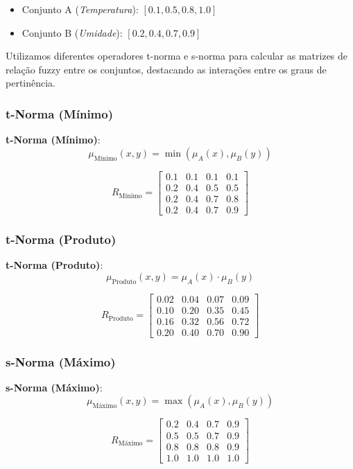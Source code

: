 \documentclass[a4paper,12pt]{article}
\begin{document}
\begin{itemize}
    \item Conjunto A (\textit{Temperatura}): $[0.1, 0.5, 0.8, 1.0]$
    \item Conjunto B (\textit{Umidade}): $[0.2, 0.4, 0.7, 0.9]$
\end{itemize}

Utilizamos diferentes operadores t-norma e s-norma para calcular as matrizes de relação fuzzy entre os conjuntos, destacando as interações entre os graus de pertinência.

\subsubsection{t-Norma (Mínimo)}

\textbf{t-Norma (Mínimo)}:
\[
\mu_{\text{Mínimo}}(x, y) = \min(\mu_A(x), \mu_B(y))
\]

\[
R_{\text{Mínimo}} =
\begin{bmatrix}
0.1 & 0.1 & 0.1 & 0.1 \\
0.2 & 0.4 & 0.5 & 0.5 \\
0.2 & 0.4 & 0.7 & 0.8 \\
0.2 & 0.4 & 0.7 & 0.9
\end{bmatrix}
\]

\subsubsection{t-Norma (Produto)}

\textbf{t-Norma (Produto)}:
\[
\mu_{\text{Produto}}(x, y) = \mu_A(x) \cdot \mu_B(y)
\]

\[
R_{\text{Produto}} =
\begin{bmatrix}
0.02 & 0.04 & 0.07 & 0.09 \\
0.10 & 0.20 & 0.35 & 0.45 \\
0.16 & 0.32 & 0.56 & 0.72 \\
0.20 & 0.40 & 0.70 & 0.90
\end{bmatrix}
\]

\subsubsection{s-Norma (Máximo)}

\textbf{s-Norma (Máximo)}:
\[
\mu_{\text{Máximo}}(x, y) = \max(\mu_A(x), \mu_B(y))
\]

\[
R_{\text{Máximo}} =
\begin{bmatrix}
0.2 & 0.4 & 0.7 & 0.9 \\
0.5 & 0.5 & 0.7 & 0.9 \\
0.8 & 0.8 & 0.8 & 0.9 \\
1.0 & 1.0 & 1.0 & 1.0
\end{bmatrix}
\]
\end{document}
